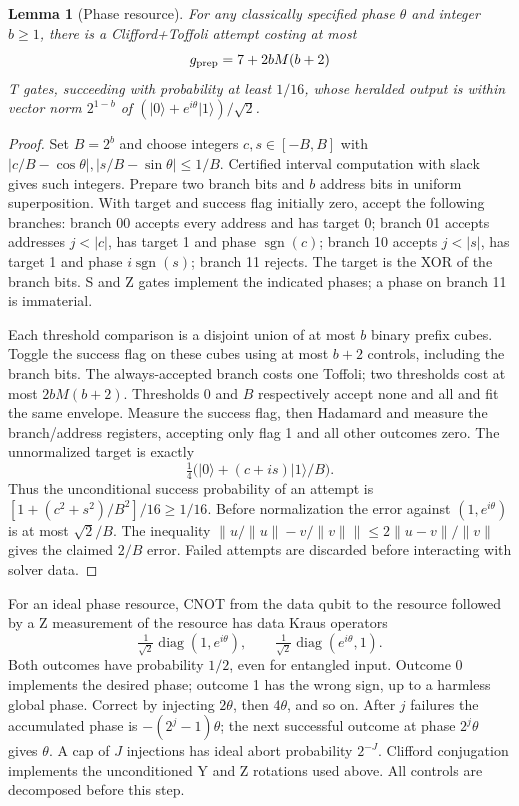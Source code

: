 \documentclass[11pt]{article}
\newtheorem{lemma}{Lemma}
\newcommand{\ket}[1]{\lvert #1\rangle}
\newcommand{\norm}[1]{\lVert #1\rVert}
\begin{document}
\begin{lemma}[Phase resource]\label{lem:resource}
For any classically specified phase $\theta$ and integer $b\ge1$, there is a Clifford+Toffoli attempt costing at most
\begin{equation}\label{eq:resource}
 g_{\rm prep}=7+2bM(b+2)
\end{equation}
T gates, succeeding with probability at least $1/16$, whose heralded output is within vector norm $2^{1-b}$ of $(\ket0+e^{i\theta}\ket1)/\sqrt2$.
\end{lemma}
\begin{proof}
Set $B=2^b$ and choose integers $c,s\in[-B,B]$ with $|c/B-\cos\theta|,|s/B-\sin\theta|\le1/B$. Certified interval computation with slack gives such integers. Prepare two branch bits and $b$ address bits in uniform superposition. With target and success flag initially zero, accept the following branches: branch 00 accepts every address and has target 0; branch 01 accepts addresses $j<|c|$, has target 1 and phase $\operatorname{sgn}(c)$; branch 10 accepts $j<|s|$, has target 1 and phase $i\operatorname{sgn}(s)$; branch 11 rejects. The target is the XOR of the branch bits. S and Z gates implement the indicated phases; a phase on branch 11 is immaterial.

Each threshold comparison is a disjoint union of at most $b$ binary prefix cubes. Toggle the success flag on these cubes using at most $b+2$ controls, including the branch bits. The always-accepted branch costs one Toffoli; two thresholds cost at most $2bM(b+2)$. Thresholds 0 and $B$ respectively accept none and all and fit the same envelope. Measure the success flag, then Hadamard and measure the branch/address registers, accepting only flag 1 and all other outcomes zero. The unnormalized target is exactly
\begin{equation}
 \tfrac14\bigl(\ket0+(c+is)\ket1/B\bigr).
\end{equation}
Thus the unconditional success probability of an attempt is $[1+(c^2+s^2)/B^2]/16\ge1/16$. Before normalization the error against $(1,e^{i\theta})$ is at most $\sqrt2/B$. The inequality $\norm{u/\norm u-v/\norm v}\le2\norm{u-v}/\norm v$ gives the claimed $2/B$ error. Failed attempts are discarded before interacting with solver data.
\end{proof}

For an ideal phase resource, CNOT from the data qubit to the resource followed by a Z measurement of the resource has data Kraus operators
\begin{equation}
 \tfrac1{\sqrt2}\operatorname{diag}(1,e^{i\theta}),\qquad
 \tfrac1{\sqrt2}\operatorname{diag}(e^{i\theta},1).
\end{equation}
Both outcomes have probability $1/2$, even for entangled input. Outcome 0 implements the desired phase; outcome 1 has the wrong sign, up to a harmless global phase. Correct by injecting $2\theta$, then $4\theta$, and so on. After $j$ failures the accumulated phase is $-(2^j-1)\theta$; the next successful outcome at phase $2^j\theta$ gives $\theta$. A cap of $J$ injections has ideal abort probability $2^{-J}$. Clifford conjugation implements the unconditioned Y and Z rotations used above. All controls are decomposed before this step.
\end{document}
